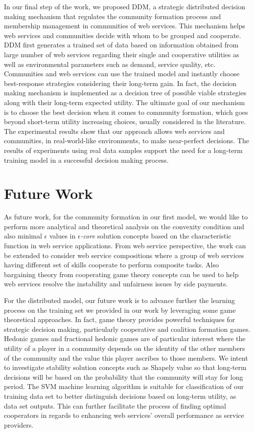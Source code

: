 In our final step of the work, we proposed DDM, a strategic distributed decision making mechanism that regulates the community formation process and  membership management in communities of web services. This mechanism helps web services and communities decide with whom to be grouped and cooperate. DDM first generates a trained set of data based on information obtained from large number of web services regarding their single and cooperative utilities as well as environmental parameters such as demand, service quality, etc. Communities and web services can use the trained model and instantly choose best-response strategies considering their long-term gain. In fact, the decision making mechanism is implemented as a decision tree of possible viable strategies along with their long-term expected utility. The ultimate goal of our mechanism is to choose the best decision when it comes to community formation, which goes beyond short-term utility increasing choices, usually considered in the literature. The experimental results show that our approach allows web services and communities, in real-world-like environments, to make near-perfect decisions. The results of experiments using real data samples support the need for a long-term training model in a successful decision making process.

\section{Future Work}

As future work, for the community formation in our first model, we would like to perform more analytical and theoretical analysis on the convexity condition and also minimal
$\epsilon$ values in \emph{$\epsilon$-core} solution concepts based on the characteristic function in web service applications. From web service perspective, the work can be extended to consider web service compositions where a group of web services having different set of skills cooperate to perform composite tasks. Also bargaining theory from cooperating game theory concepts can be used to help web services resolve the instability and unfairness issues by side payments.

For the distributed model, our future work is to advance further the learning process on the training set we provided in our work by leveraging some game theoretical approaches. In fact, game theory provides powerful techniques for strategic decision making, particularly cooperative and coalition formation games. Hedonic games and fractional hedonic games are of particular interest where the utility of a player in a community depends on the identity of the other members of the community and the value this player ascribes to those members. We intent to investigate stability solution concepts such as Shapely value so that long-term decisions will be based on the probability that the community will stay for long period. The SVM machine learning algorithm is suitable for classification of our training data set to better distinguish  decisions based on long-term utility, as data set outputs. This can further facilitate the process of finding optimal cooperators in regards to enhancing web services' overall performance as service providers.

